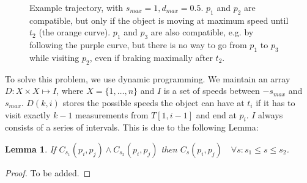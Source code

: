 \documentclass{article}
\newtheorem{lemma}[theorem]{Lemma}
\begin{document}
\begin{figure}
    \centering
    \caption{Example trajectory, with \(s_{max}=1, d_{max}=0.5\). \(p_1\) and \(p_2\) are compatible, but only if the object is moving at maximum speed until \(t_2\) (the orange curve). \(p_1\) and \(p_3\) are also compatible, e.g. by following the purple curve, but there is no way to go from \(p_1\) to \(p_3\) while visiting \(p_2\), even if braking maximally after \(t_2\).}
    \label{fig:speedproblem}
\end{figure}

To solve this problem, we use dynamic programming. We maintain an array \(D: X \times X \mapsto I\), where \(X=\{1,\dots,n\}\) and \(I\) is a set of speeds between \(-s_{max}\) and \(s_{max}\). \(D(k,i)\) stores the possible speeds the object can have at \(t_i\) if it has to visit exactly \(k-1\) measurements from \(T[1,i-1]\) and end at \(p_i\). \(I\) always consists of a series of intervals. This is due to the following Lemma:
\begin{lemma}
If \(C_{s_1}(p_i,p_j) \land C_{s_2}(p_i,p_j)\) then \(C_s(p_i,p_j)\quad\forall s: s_1 \leq s \leq s_2\). 
\end{lemma}
\begin{proof}
To be added.
\end{proof}
\end{document}
